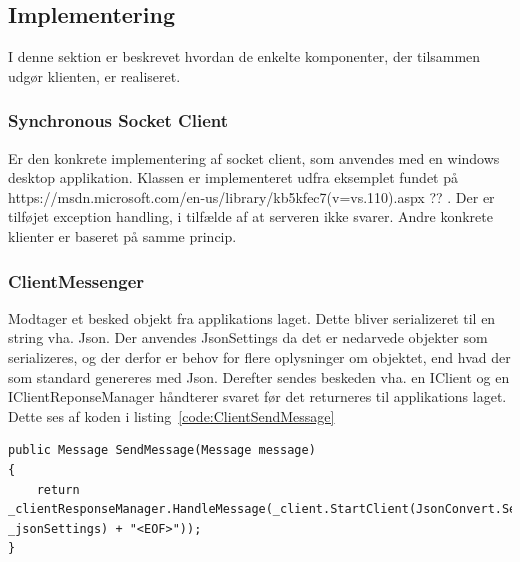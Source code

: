 \subsection{Implementering}
I denne sektion er beskrevet hvordan de enkelte komponenter, der tilsammen udgør klienten, er realiseret.

\subsubsection{Synchronous Socket Client}
Er den konkrete implementering af socket client, som anvendes med en windows desktop applikation. Klassen er implementeret udfra eksemplet fundet på https://msdn.microsoft.com/en-us/library/kb5kfec7(v=vs.110).aspx ?? . Der er tilføjet exception handling, i tilfælde af at serveren ikke svarer. Andre konkrete klienter er baseret på samme princip.

\subsubsection{ClientMessenger}
Modtager et besked objekt fra applikations laget. Dette bliver serializeret til en string vha. Json. Der anvendes JsonSettings da det er nedarvede objekter som serializeres, og der derfor er behov for flere oplysninger om objektet, end hvad der som standard genereres med Json. Derefter sendes beskeden vha. en IClient og en IClientReponseManager håndterer svaret før det returneres til applikations laget. Dette ses af koden i listing~\ref{code:ClientSendMessage} 
\begin{lstlisting}[caption=Client.SendMessage,label=code:ClientSendMessage]
public Message SendMessage(Message message)
{
	return _clientResponseManager.HandleMessage(_client.StartClient(JsonConvert.SerializeObject(message, _jsonSettings) + "<EOF>"));
}
\end{lstlisting}

